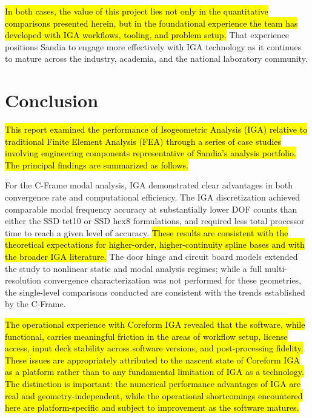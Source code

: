 \documentclass[12pt,report,justified]{SANDreport}
\begin{document}
\hl{In both cases, the value of this project lies not only in the quantitative comparisons
presented herein, but in the foundational experience the team has developed with IGA
workflows, tooling, and problem setup.}  That experience positions Sandia to engage more
effectively with IGA technology as it continues to mature across the industry, academia,
and the national laboratory community.





\chapter{Conclusion}

\hl{This report examined the performance of Isogeometric Analysis (IGA) relative to
traditional Finite Element Analysis (FEA) through a series of case studies involving
engineering components representative of Sandia's analysis portfolio.  The principal
findings are summarized as follows.}

For the C-Frame modal analysis, IGA demonstrated clear advantages in both convergence
rate and computational efficiency.  The IGA discretization achieved comparable modal
frequency accuracy at substantially lower DOF counts than either the SSD tet10 or SSD
hex8 formulations, and required less total processor time to reach a given level of
accuracy.  \hl{These results are consistent with the theoretical expectations for
higher-order, higher-continuity spline bases and with the broader IGA literature.}  The
door hinge and circuit board models extended the study to nonlinear static and modal
analysis regimes; while a full multi-resolution convergence characterization was not
performed for these geometries, the single-level comparisons conducted are consistent
with the trends established by the C-Frame.

\hl{The operational experience with Coreform IGA revealed that the software, while
functional, carries meaningful friction in the areas of workflow setup, license access,
input deck stability across software versions, and post-processing fidelity.  These
issues are appropriately attributed to the nascent state of Coreform IGA as a platform
rather than to any fundamental limitation of IGA as a technology.  The distinction is
important: the numerical performance advantages of IGA are real and geometry-independent,
while the operational shortcomings encountered here are platform-specific and subject to
improvement as the software matures.}
\end{document}
